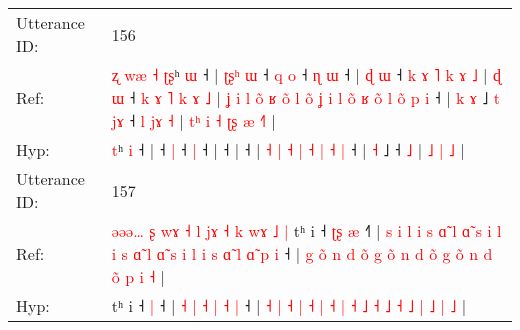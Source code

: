 \documentclass[10pt]{article}
\DeclareRobustCommand{\hl}[1]{{\textcolor{red}{#1}}}
\begin{document}
\begin{longtable}{ll}
 \\
\midrule
Utterance ID: & 156 \\
Ref: & \hl{ʐ}\hl{ }\hl{w}\hl{æ}\hl{ }\hl{˧}\hl{ }\hl{ʈ}\hl{ʂ}ʰ \hl{ɯ} ˧ |\hl{ }\hl{ʈ}\hl{ʂ}\hl{ʰ}\hl{ }\hl{ɯ} ˧\hl{ }\hl{q} \hl{o} ˧\hl{ }\hl{ɳ} \hl{ɯ} ˧ |\hl{ }\hl{ɖ}\hl{ }\hl{ɯ} ˧\hl{ }\hl{k}\hl{ }\hl{ɤ}\hl{ }\hl{˥}\hl{ }\hl{k}\hl{ }\hl{ɤ}\hl{ }\hl{˩} |\hl{ }\hl{ɖ}\hl{ }\hl{ɯ} ˧\hl{ }\hl{k}\hl{ }\hl{ɤ}\hl{ }\hl{˥}\hl{ }\hl{k}\hl{ }\hl{ɤ}\hl{ }\hl{˩} |\hl{ }\hl{ʝ}\hl{ }\hl{i}\hl{ }\hl{l}\hl{ }\hl{o}\hl{̃}\hl{ }\hl{ʁ}\hl{ }\hl{o}\hl{̃}\hl{ }\hl{l}\hl{ }\hl{o}\hl{̃}\hl{ }\hl{ʝ}\hl{ }\hl{i} \hl{l} \hl{o}\hl{̃} \hl{ʁ} \hl{o}\hl{̃} \hl{l} \hl{o}\hl{̃} \hl{p} \hl{i} ˧ |\hl{ }\hl{k} \hl{ɤ} ˩\hl{ }\hl{t}\hl{ }\hl{j}\hl{ɤ} ˧\hl{ }\hl{l}\hl{ }\hl{j}\hl{ɤ} \hl{˧} |\hl{ }\hl{t}\hl{ʰ}\hl{ }\hl{i}\hl{ }\hl{˧} \hl{ʈ}\hl{ʂ} \hl{æ} \hl{˧}\hl{˥} |
 \\
Hyp: & \hl{}\hl{}\hl{}\hl{}\hl{}\hl{}\hl{}\hl{}\hl{t}ʰ \hl{i} ˧ |\hl{}\hl{}\hl{}\hl{}\hl{}\hl{} ˧\hl{}\hl{} \hl{|} ˧\hl{}\hl{} \hl{|} ˧ |\hl{}\hl{}\hl{}\hl{} ˧\hl{}\hl{}\hl{}\hl{}\hl{}\hl{}\hl{}\hl{}\hl{}\hl{}\hl{}\hl{} |\hl{}\hl{}\hl{}\hl{} ˧\hl{}\hl{}\hl{}\hl{}\hl{}\hl{}\hl{}\hl{}\hl{}\hl{}\hl{}\hl{} |\hl{}\hl{}\hl{}\hl{}\hl{}\hl{}\hl{}\hl{}\hl{}\hl{}\hl{}\hl{}\hl{}\hl{}\hl{}\hl{}\hl{}\hl{}\hl{}\hl{}\hl{}\hl{}\hl{} \hl{˧} \hl{}\hl{|} \hl{˧} \hl{}\hl{|} \hl{˧} \hl{}\hl{|} \hl{˧} \hl{|} ˧ |\hl{}\hl{} \hl{˧} ˩\hl{}\hl{}\hl{}\hl{}\hl{} ˧\hl{}\hl{}\hl{}\hl{}\hl{} \hl{˩} |\hl{}\hl{}\hl{}\hl{}\hl{}\hl{}\hl{} \hl{}\hl{˩} \hl{|} \hl{}\hl{˩} |
 \\
\midrule
Utterance ID: & 157 \\
Ref: & \hl{ə}\hl{ə}\hl{ə}\hl{…}\hl{ }\hl{ʂ}\hl{ }\hl{w}\hl{ɤ}\hl{ }\hl{˧}\hl{ }\hl{l}\hl{ }\hl{j}\hl{ɤ}\hl{ }\hl{˧}\hl{ }\hl{k}\hl{ }\hl{w}\hl{ɤ}\hl{ }\hl{˩}\hl{ }\hl{|}\hl{ }tʰ i ˧\hl{ }\hl{ʈ}\hl{ʂ} \hl{æ} ˧\hl{˥} |\hl{ }\hl{s}\hl{ }\hl{i}\hl{ }\hl{l}\hl{ }\hl{i}\hl{ }\hl{s}\hl{ }\hl{ɑ}\hl{̃}\hl{ }\hl{l}\hl{ }\hl{ɑ}\hl{̃}\hl{ }\hl{s}\hl{ }\hl{i}\hl{ }\hl{l}\hl{ }\hl{i}\hl{ }\hl{s}\hl{ }\hl{ɑ}\hl{̃}\hl{ }\hl{l}\hl{ }\hl{ɑ}\hl{̃}\hl{ }\hl{s}\hl{ }\hl{i}\hl{ }\hl{l}\hl{ }\hl{i} \hl{s} \hl{ɑ}\hl{̃} \hl{l} \hl{ɑ}\hl{̃} \hl{p} \hl{i} ˧ | \hl{g} \hl{o}\hl{̃} \hl{n} \hl{d} \hl{o}\hl{̃} \hl{g} \hl{o}\hl{̃} \hl{n} \hl{d} \hl{o}\hl{̃} \hl{g} \hl{o}\hl{̃} \hl{n} \hl{d} \hl{o}\hl{̃} \hl{p} \hl{i} \hl{˧} |
 \\
Hyp: & \hl{}\hl{}\hl{}\hl{}\hl{}\hl{}\hl{}\hl{}\hl{}\hl{}\hl{}\hl{}\hl{}\hl{}\hl{}\hl{}\hl{}\hl{}\hl{}\hl{}\hl{}\hl{}\hl{}\hl{}\hl{}\hl{}\hl{}\hl{}tʰ i ˧\hl{}\hl{}\hl{} \hl{|} ˧\hl{} |\hl{}\hl{}\hl{}\hl{}\hl{}\hl{}\hl{}\hl{}\hl{}\hl{}\hl{}\hl{}\hl{}\hl{}\hl{}\hl{}\hl{}\hl{}\hl{}\hl{}\hl{}\hl{}\hl{}\hl{}\hl{}\hl{}\hl{}\hl{}\hl{}\hl{}\hl{}\hl{}\hl{}\hl{}\hl{}\hl{}\hl{}\hl{}\hl{}\hl{}\hl{}\hl{}\hl{}\hl{} \hl{˧} \hl{}\hl{|} \hl{˧} \hl{}\hl{|} \hl{˧} \hl{|} ˧ | \hl{˧} \hl{}\hl{|} \hl{˧} \hl{|} \hl{}\hl{˧} \hl{|} \hl{}\hl{˧} \hl{|} \hl{˧} \hl{}\hl{˩} \hl{˧} \hl{}\hl{˩} \hl{˧} \hl{˩} \hl{}\hl{|} \hl{˩} \hl{|} \hl{˩} |

\end{longtable}
\end{document}
